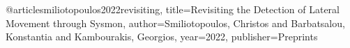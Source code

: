 @article{smiliotopoulos2022revisiting,
  title={Revisiting the Detection of Lateral Movement through Sysmon},
  author={Smiliotopoulos, Christos and Barbatsalou, Konstantia and Kambourakis, Georgios},
  year={2022},
  publisher={Preprints}
}
